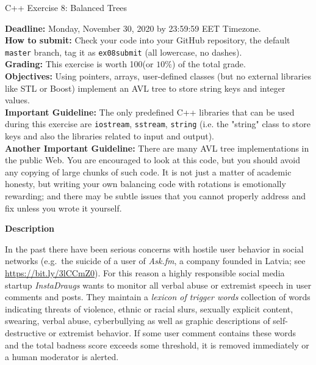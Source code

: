 \documentclass[11pt]{article}
\begin{document}
\thispagestyle{empty}


\begin{center}
{\Large C++ Exercise 8: Balanced Trees}
\end{center}

{\bf Deadline:} Monday, November 30, 2020 by 23:59:59 EET Timezone.\\ 
{\bf How to submit:} Check your code into your GitHub repository, 
the default {\tt master} branch, 
tag it as {\tt ex08submit} (all lowercase, no dashes).\\
{\bf Grading:} This exercise is worth 100\textperthousand (or $10\%$) of the total grade.\\
{\bf Objectives:} Using pointers, arrays, user-defined classes (but no external libraries like STL 
or Boost) implement an AVL tree to store string keys and
integer values.\\
{\bf Important Guideline:} The only predefined C++ libraries that can be
used during this exercise are {\tt iostream}, 
{\tt sstream}, {\tt string} (i.e. the "string" class to store 
keys and also the libraries related to input and output).\\
{\bf Another Important Guideline:} There are many AVL tree implementations in the public 
Web. You are encouraged to look at this code, but 
you should avoid any copying of large chunks of such code.
It is not just a matter of academic honesty, 
but writing your own balancing code with rotations is 
emotionally rewarding; and there may be 
subtle issues that you cannot properly address and fix unless you wrote it yourself.




\vspace{20pt}
{\bf \large Description}

In the past there have been serious concerns with hostile user behavior 
in social networks (e.g.\ the suicide of a user of 
{\em Ask.fm}, a company founded in Latvia; see \url{https://bit.ly/3lCCmZ0}). 
For this reason a highly responsible social media startup {\em InstaDraugs} 
wants to monitor all verbal abuse or 
extremist speech in user comments and posts.  
They maintain a {\em lexicon of trigger words} \textendash{}
collection of words indicating threats of violence, ethnic or racial slurs, 
sexually explicit content, swearing, verbal abuse, cyberbullying
as well as graphic descriptions of self-destructive or extremist behavior. If some 
user comment contains these words and the total badness score exceeds some threshold,
it is removed immediately or a human moderator is alerted.
\end{document}
